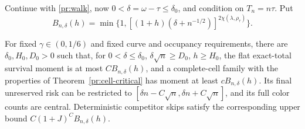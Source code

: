 Continue with \eqref{pr:walk}, now $0<\delta=\omega-\tau\le\delta_0$,
and condition on $T_n=n\tau$. Put
\begin{equation}
 B_{n,\delta}(h)=
 \min\{1,[(1+h)(\delta+n^{-1/2})]^{2\chi(\lambda,\rho_\tau)}\}.
 \label{pr:driftscale}
\end{equation}

\begin{theorem}\label{pr:cell-drift}
For fixed $\gamma\in(0,1/6)$ and fixed curve and occupancy requirements,
there are $\delta_0,H_0,D_0>0$ such that, for
$0<\delta\le\delta_0$, $\delta\sqrt n\ge D_0$, $h\ge H_0$,
the flat exact-total survival moment is at most $C B_{n,\delta}(h)$,
and a complete-cell family with the properties of
Theorem~\ref{pr:cell-critical} has moment at least $c B_{n,\delta}(h)$.
Its final unreserved risk can be restricted to
$[\delta n-C\sqrt n,\delta n+C\sqrt n]$, and its full color counts are
central. Deterministic competitor skips satisfy the corresponding upper
bound $C(1+J)^C B_{n,\delta}(h)$.
\end{theorem}

